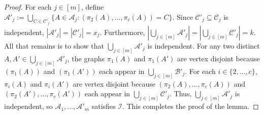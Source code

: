 \documentclass{patmorin}
\newcommand{\pat}[1]{\textcolor{Blue}{[Pat: #1]}}
\DeclarePairedDelimiter\set{\{}{\}}
\renewcommand{\mid}{:}  %
\begin{document}
\begin{proof}
For each $j\in[m]$, define $\mathcal{A}'_j:=\bigcup_{C\in\mathcal{C}'_j}\{A\in\mathcal{A}_j\mid (\pi_2(A),\ldots,\pi_c(A))=C\}$.  Since $\mathcal{C}'_j\subseteq\mathcal{C}_j$ is independent,  $|\mathcal{A}'_j|=|\mathcal{C}'_j|=x_j$. 
Furthermore, $|\bigcup_{j\in[m]}\mathcal{A}'_j|=|\bigcup_{j\in[m]}\mathcal{C}'_j|=k$.
All that remains is to show that $\bigcup_{j\in[m]}\mathcal{A}'_j$ is independent.
For any two distinct $A,A'\in\bigcup_{j\in[m]}\mathcal{A}'_j$, the graphs $\pi_1(A)$ and $\pi_1(A')$ are vertex disjoint because $(\pi_1(A))$ and $(\pi_1(A'))$ each appear in $\bigcup_{j\in[m]}\mathcal{B}'_j$.  For each $i\in\{2,\ldots,c\}$, $\pi_i(A)$ and $\pi_i(A')$ are vertex disjoint because $(\pi_2(A),\ldots,\pi_c(A))$ and 
$(\pi_2(A'),\ldots,\pi_c(A'))$ each appear in $\bigcup_{j\in[m]}\mathcal{C}'_j$.  Thus, $\bigcup_{j\in[m]}\mathcal{A}'_j$ is independent, so $\mathcal{A}_1,\ldots,\mathcal{A}'_m$ satisfies $\mathcal{I}$.
This completes the proof of the lemma.
\end{proof}




\end{document}
